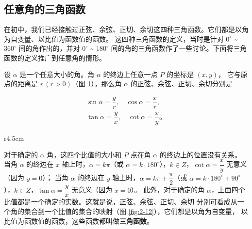 \subsection{任意角的三角函数}\label{subsec:2-3}

在初中，我们已经接触过正弦、余弦、正切、余切这四种三角函数。它们都是以角为自变量、以比值为函数值的函数。
这四种三角函数的定义，当时是针对 $0^\circ$ \~{} $360^\circ$ 间的角作出的，并对 $0^\circ$ \~{} $180^\circ$
间的角的三角函数作了一些讨论。下面将三角函数的定义推广到任意角的情形。

\begin{figure}[htbp]
    \centering
    \begin{minipage}{8cm}
    \centering
    
    \caption*{（）}
    \end{minipage}
    \qquad
    \begin{minipage}{8cm}
    \centering
    
    \caption*{（）}
    \end{minipage}
    \begin{minipage}{8cm}
    \centering
    
    \caption*{（）}
    \end{minipage}
    \qquad
    \begin{minipage}{8cm}
    \centering
    
    \caption*{（）}
    \end{minipage}
    \caption{}\label{fig:2-11}
\end{figure}

设 $\alpha$ 是一个任意大小的角。角 $\alpha$ 的终边上任意一点 $P$ 的坐标是 $(x, y)$，
它与原点的距离是 $r \, (r > 0)$（图 \ref{fig:2-11}），那么角 $\alpha$ 的正弦、余弦、正切、余切分别是

\begin{gather*}
    \sin \alpha = \dfrac y r , \quad \cos \alpha = \dfrac x r , \\
    \tan \alpha = \dfrac y x , \quad \cot \alpha = \dfrac x y \text{。}
\end{gather*}

\begin{wrapfigure}[13]{r}{4.5cm}
    \centering
    
    \vspace{-20pt}
    \caption{}\label{fig:2-12}
\end{wrapfigure}

\vspace{0.5em}
对于确定的 $\alpha$ 角，这四个比值的大小和 $P$ 点在角 $\alpha$ 的终边上的位置没有关系。
当角 $\alpha$ 的终边在 $x$ 轴上时，$\alpha = k \pi$（或 $\alpha = k \cdot 180^\circ$），$k \in Z$，$\cot \alpha = \dfrac x y$ 无意义（因为 $y = 0$）；
当角 $\alpha$ 的终边在 $y$ 轴上时，$\alpha = k \pi + \dfrac \pi 2$（或 $\alpha = k \cdot 180^\circ + 90^\circ$），$k \in Z$，$\tan \alpha = \dfrac y x$ 无意义（因为 $x = 0$）。
此外，对于确定的角 $\alpha$，上面四个比值都是一个确定的实数。这就是说，正弦、余弦、正切、余切
分别可看成从一个角的集合到一个比值的集合的映射（图 \ref{fig:2-12}），它们都是以角为自变量，
以比值为函数值的函数，这些函数都叫做\textbf{三角函数}。

